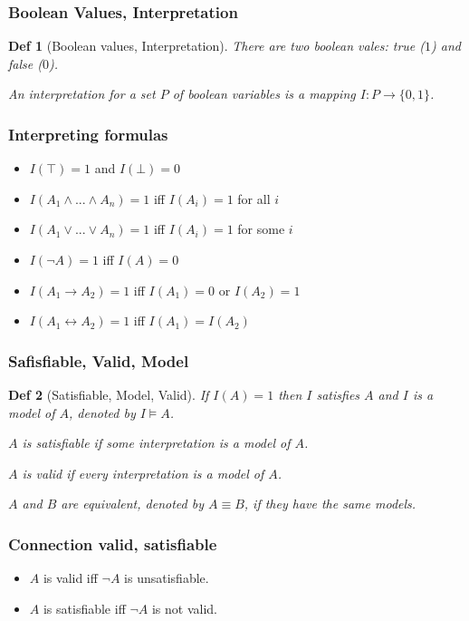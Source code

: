 \documentclass[]{article}
\newtheorem*{definition*}{Def}
\begin{document}
\subsubsection{Boolean Values, Interpretation}
\begin{definition*}[Boolean values, Interpretation]
	There are two boolean vales: true ($1$) and false ($0$).
	
	An interpretation for a set $P$ of boolean variables is a mapping $I : P \rightarrow \{0,1\}$.
\end{definition*}

\subsubsection{Interpreting formulas}
\begin{itemize}
	\item $I(\top) = 1$ and $I(\bot) = 0$
	\item $I(A_1 \land ... \land A_n) = 1$ iff $I(A_i) = 1$ for all $i$
	\item $I(A_1 \lor ... \lor A_n) = 1$ iff $I(A_i) = 1$ for some $i$
	\item $I(\lnot A) = 1$ iff $I(A) = 0$
	\item $I(A_1 \rightarrow A_2) = 1$ iff $I(A_1) = 0$ or $I(A_2) = 1$
	\item $I(A_1 \leftrightarrow A_2) = 1$ iff $I(A_1) = I(A_2)$
\end{itemize}

\subsubsection{Safisfiable, Valid, Model}
\begin{definition*}[Satisfiable, Model, Valid]
	If $I(A) = 1$ then $I$ satisfies $A$ and $I$ is a model of $A$, denoted by $I \models A$.
	
	$A$ is satisfiable if some interpretation is a model of $A$.
	
	$A$ is valid if every interpretation is a model of $A$.
	
	$A$ and $B$ are equivalent, denoted by $A \equiv B$, if they have the same models.
\end{definition*}

\subsubsection{Connection valid, satisfiable}
\begin{itemize}
	\item $A$ is valid iff $\lnot A$ is unsatisfiable.
	\item $A$ is satisfiable iff $\lnot A$ is not valid.
\end{itemize}
\end{document}
